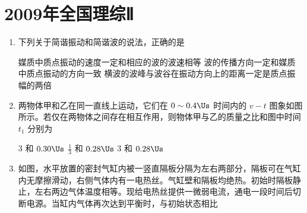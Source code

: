 \documentclass[\gkver]{gaokaozhenti}
\begin{document}
\chapter{2009年全国理综Ⅱ}

\begin{enumerate}
\item
下列关于简谐振动和简谐波的说法，正确的是

{媒质中质点振动的速度一定和相应的波的波速相等}
{波的传播方向一定和媒质中质点振动的方向一致}
{横波的波峰与波谷在振动方向上的距离一定是质点振幅的两倍}


\item
两物体甲和乙在同一直线上运动，它们在 $0\sim0.4\Us$ 时间内的 $v-t$ 图象如图所示。若仅在两物体之间存在相互作用，则物体甲与乙的质量之比和图中时间 $t_{1}$ 分别为


{$3$ 和 $0.30\Us$}
{$\frac{1}{3}$ 和 $0.28\Us$}
{$3$ 和 $0.28\Us$}


\item
如图，水平放置的密封气缸内被一竖直隔板分隔为左右两部分，隔板可在气缸内无摩擦滑动，右侧气体内有一电热丝。气缸壁和隔板均绝热。初始时隔板静止，左右两边气体温度相等。现给电热丝提供一微弱电流，通电一段时间后切断电源。当缸内气体再次达到平衡时，与初始状态相比


\end{enumerate}
\end{document}
